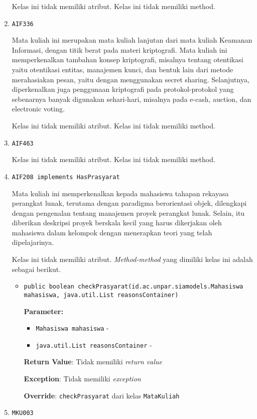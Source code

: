 \documentclass{article}
\begin{document}
\begin{enumerate}
Kelas ini tidak memiliki atribut. Kelas ini tidak memiliki method. \item \texttt{AIF336}

Mata kuliah ini merupakan mata kuliah lanjutan dari mata kuliah Keamanan 
 Informasi, dengan titik berat pada materi kriptografi. Mata kuliah ini 
 memperkenalkan tambahan konsep kriptografi, misalnya tentang otentikasi 
 yaitu otentikasi entitas, manajemen kunci, dan bentuk lain dari metode 
 merahasiakan pesan, yaitu dengan menggunakan secret sharing. Selanjutnya, 
 diperkenalkan juga penggunaan kriptografi pada protokol-protokol yang 
 sebenarnya banyak digunakan sehari-hari, misalnya pada e-cash, auction, 
 dan electronic voting.

Kelas ini tidak memiliki atribut. Kelas ini tidak memiliki method. \item \texttt{AIF463}



Kelas ini tidak memiliki atribut. Kelas ini tidak memiliki method. \item \texttt{AIF208 implements HasPrasyarat}

Mata kuliah ini memperkenalkan kepada mahasiswa tahapan rekayasa perangkat 
 lunak, terutama dengan paradigma berorientasi objek, dilengkapi dengan 
 pengenalan tentang manajemen proyek perangkat lunak.
 Selain, itu diberikan deskripsi proyek berskala kecil yang harus dikerjakan 
 oleh mahasiswa dalam kelompok dengan menerapkan teori yang telah 
 dipelajarinya.

Kelas ini tidak memiliki atribut. \textit{Method-method} yang dimiliki kelas ini adalah sebagai berikut.
\begin{itemize}
\item \texttt{public boolean checkPrasyarat(id.ac.unpar.siamodels.Mahasiswa mahasiswa, java.util.List reasonsContainer)}

\textbf{Parameter:}
\begin{itemize}
\item \texttt{Mahasiswa mahasiswa} - 
\item \texttt{java.util.List reasonsContainer} - 
\end{itemize}
\textbf{Return Value}: Tidak memiliki \textit{return value}

\textbf{Exception}: Tidak memiliki \textit{exception}

\textbf{Override}: \texttt{checkPrasyarat} dari kelas \texttt{MataKuliah}

\end{itemize}
\item \texttt{MKU003}


\end{enumerate}
\end{document}

